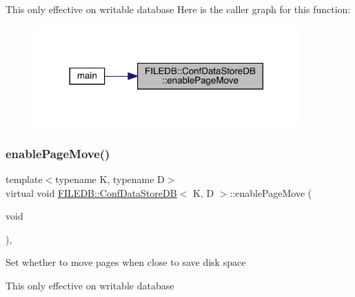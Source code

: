 This only effective on writable database Here is the caller graph for this function\+:\nopagebreak
\begin{figure}[H]
\begin{center}
\leavevmode
\includegraphics[width=290pt]{d8/d19/classFILEDB_1_1ConfDataStoreDB_ae8f437f44366624ac0d5aba306a5ba42_icgraph}
\end{center}
\end{figure}
\mbox{\label{classFILEDB_1_1ConfDataStoreDB_ae8f437f44366624ac0d5aba306a5ba42}} 
\subsubsection{\texorpdfstring{enablePageMove()}{enablePageMove()}\hspace{0.1cm}{\footnotesize\ttfamily [2/2]}}
{\footnotesize\ttfamily template$<$typename K, typename D$>$ \\
virtual void \mbox{\hyperlink{classFILEDB_1_1ConfDataStoreDB}{F\+I\+L\+E\+D\+B\+::\+Conf\+Data\+Store\+DB}}$<$ K, D $>$\+::enable\+Page\+Move (\begin{DoxyParamCaption}\item[{void}]{ }\end{DoxyParamCaption})\hspace{0.3cm}{\ttfamily [inline]}, {\ttfamily [virtual]}}

Set whether to move pages when close to save disk space

This only effective on writable database \mbox{\label{classFILEDB_1_1ConfDataStoreDB_afedf2b2ec0b10469cebb72397b02459d}} 
